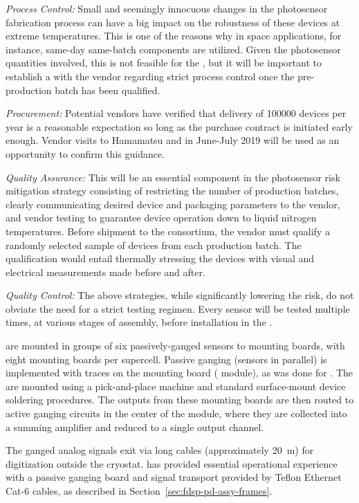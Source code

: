 {\textit{Process Control:}} Small and seemingly innocuous
changes in the photosensor fabrication process can have a big impact on the robustness of these devices at extreme temperatures. This is one of the reasons why in space applications, for instance, same-day same-batch components are utilized. Given the photosensor quantities involved, this is not feasible for the  , but
it will be important to establish a  with the vendor regarding 
strict process control once the pre-production batch has been qualified.

{\textit{Procurement:}} Potential vendors have verified that delivery of \num{100000} devices per year is a reasonable expectation so long as the purchase contract is initiated early enough.  Vendor visits to Hamamatsu and  in June-July 2019 will be used as an opportunity to confirm this guidance.

{\textit{Quality Assurance:}} This will be an essential component in the photosensor risk mitigation strategy consisting of restricting the number of production batches, clearly communicating desired device and packaging parameters to the vendor, and vendor testing to
guarantee device operation down to liquid nitrogen temperatures.
Before shipment to the consortium, the vendor 
must qualify a randomly selected sample of devices from each production batch. The qualification would entail thermally stressing the devices 
with visual and electrical measurements made before and after. 

{\textit{Quality Control:}} The above strategies, while significantly lowering the risk, do not obviate the need for a strict testing regimen. Every sensor will be tested multiple times, at various stages of assembly, before installation in the .

 are mounted in groups of six passively-ganged sensors to mounting boards, with eight mounting boards per supercell.  Passive ganging (sensors in parallel) is implemented with traces on the  mounting board ( module), 
as was done for .  The  are mounted using a pick-and-place machine and standard surface-mount device soldering procedures. The outputs from these mounting boards are then routed to active ganging circuits in the center of the  module, where they are collected into a summing amplifier and reduced to a single output channel.

The ganged analog signals exit via long cables (approximately \SI{20}{m}) for digitization outside the cryostat.
 has provided essential operational experience with a passive ganging board and signal transport provided by Teflon Ethernet Cat-6 cables, as described in Section~\ref{sec:fdsp-pd-assy-frames}.

